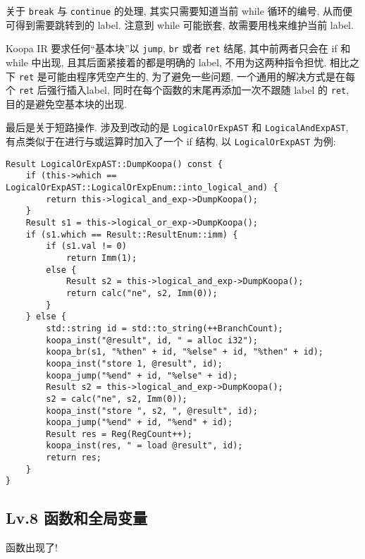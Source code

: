 \documentclass[8pt]{article}
\theoremstyle{compact}
\begin{document}
关于 \texttt{break} 与 \texttt{continue} 的处理, 其实只需要知道当前 while 循环的编号, 从而便可得到需要跳转到的 label. 注意到 while 可能嵌套, 故需要用栈来维护当前 label.

Koopa IR 要求任何“基本块”以 \texttt{jump}, \texttt{br} 或者 \texttt{ret} 结尾, 其中前两者只会在 if 和 while 中出现, 且其后面紧接着的都是明确的 label, 不用为这两种指令担忧. 相比之下 \texttt{ret} 是可能由程序凭空产生的, 为了避免一些问题, 一个通用的解决方式是在每个 \texttt{ret} 后强行插入label, 同时在每个函数的末尾再添加一次不跟随 label 的 \texttt{ret}, 目的是避免空基本块的出现.

最后是关于短路操作. 涉及到改动的是 \texttt{LogicalOrExpAST} 和 \texttt{LogicalAndExpAST}, 有点类似于在进行与或运算时加入了一个 if 结构, 以 \texttt{LogicalOrExpAST} 为例: \begin{verbatim}
Result LogicalOrExpAST::DumpKoopa() const {
    if (this->which == LogicalOrExpAST::LogicalOrExpEnum::into_logical_and) {
        return this->logical_and_exp->DumpKoopa();
    }
    Result s1 = this->logical_or_exp->DumpKoopa();
    if (s1.which == Result::ResultEnum::imm) {
        if (s1.val != 0)
            return Imm(1);
        else {
            Result s2 = this->logical_and_exp->DumpKoopa();
            return calc("ne", s2, Imm(0));
        }
    } else {
        std::string id = std::to_string(++BranchCount);
        koopa_inst("@result", id, " = alloc i32");
        koopa_br(s1, "%then" + id, "%else" + id, "%then" + id);
        koopa_inst("store 1, @result", id);
        koopa_jump("%end" + id, "%else" + id);
        Result s2 = this->logical_and_exp->DumpKoopa();
        s2 = calc("ne", s2, Imm(0));
        koopa_inst("store ", s2, ", @result", id);
        koopa_jump("%end" + id, "%end" + id);
        Result res = Reg(RegCount++);
        koopa_inst(res, " = load @result", id);
        return res;
    }
}    
\end{verbatim}
\subsection{Lv.8 函数和全局变量}
函数出现了!
\end{document}
